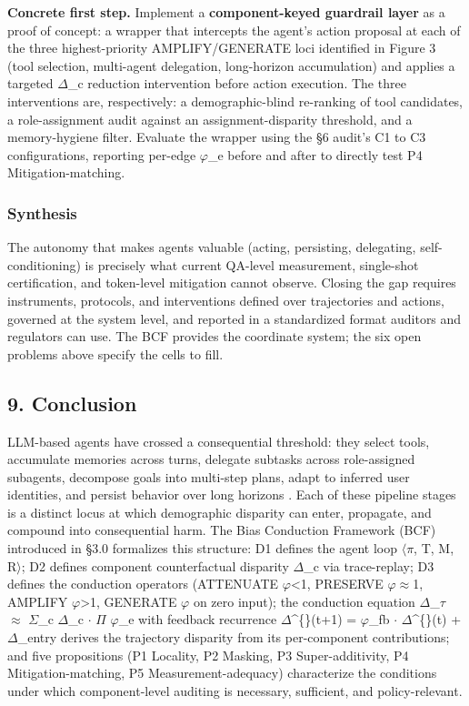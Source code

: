 \documentclass[10pt]{article}
\begin{document}
\textbf{Concrete first step.} Implement a \textbf{component-keyed guardrail layer} as a proof of concept: a wrapper that intercepts the agent's action proposal at each of the three highest-priority AMPLIFY/GENERATE loci identified in Figure 3 (tool selection, multi-agent delegation, long-horizon accumulation) and applies a targeted $\Delta$\_c reduction intervention before action execution. The three interventions are, respectively: a demographic-blind re-ranking of tool candidates, a role-assignment audit against an assignment-disparity threshold, and a memory-hygiene filter. Evaluate the wrapper using the \S{}6 audit's C1 to C3 configurations, reporting per-edge $\varphi$\_e before and after to directly test P4 Mitigation-matching.

\subsubsection*{Synthesis}

The autonomy that makes agents valuable (acting, persisting, delegating, self-conditioning) is precisely what current QA-level measurement, single-shot certification, and token-level mitigation cannot observe. Closing the gap requires instruments, protocols, and interventions defined over trajectories and actions, governed at the system level, and reported in a standardized format auditors and regulators can use. The BCF provides the coordinate system; the six open problems above specify the cells to fill.


\subsection*{9. Conclusion}

LLM-based agents have crossed a consequential threshold: they select tools, accumulate memories across turns, delegate subtasks across role-assigned subagents, decompose goals into multi-step plans, adapt to inferred user identities, and persist behavior over long horizons \cite{wang2024survey,xi2023rise}. Each of these pipeline stages is a distinct locus at which demographic disparity can enter, propagate, and compound into consequential harm. The Bias Conduction Framework (BCF) introduced in \S{}3.0 formalizes this structure: D1 defines the agent loop $\langle$$\pi$, T, M, R$\rangle$; D2 defines component counterfactual disparity $\Delta$\_c via trace-replay; D3 defines the conduction operators (ATTENUATE $\varphi$<1, PRESERVE $\varphi$$\approx$1, AMPLIFY $\varphi$>1, GENERATE $\varphi$ on zero input); the conduction equation $\Delta$\_$\tau$ $\approx$ $\Sigma$\_c $\Delta$\_c $\cdot$ $\Pi$ $\varphi$\_e with feedback recurrence $\Delta$\textasciicircum\{\}(t+1) = $\varphi$\_fb $\cdot$ $\Delta$\textasciicircum\{\}(t) + $\Delta$\_entry derives the trajectory disparity from its per-component contributions; and five propositions (P1 Locality, P2 Masking, P3 Super-additivity, P4 Mitigation-matching, P5 Measurement-adequacy) characterize the conditions under which component-level auditing is necessary, sufficient, and policy-relevant.
\end{document}
